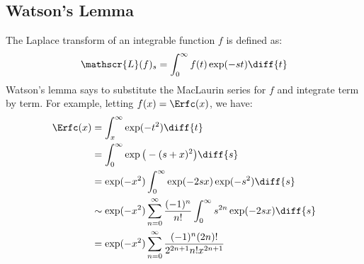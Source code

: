 \documentclass[crop=false,class=book,oneside]{standalone}
\begin{document}
        \subsection{Watson's Lemma}
            The Laplace transform of an integrable function $f$
            is defined as:
            \begin{equation}
                \mathscr{L}(f)_{s}=\int_{0}^{\infty}
                    f(t)\exp(-st)\diff{t}
            \end{equation}
            Watson's lemma says to substitute the MacLaurin
            series for $f$ and integrate term by term. For example,
            letting $f(x)=\Erfc(x)$, we have:
            \begin{align}
                \Erfc(x)&=\int_{x}^{\infty}\exp(-t^{2})\diff{t}\\
                &=\int_{0}^{\infty}\exp\big(-(s+x)^{2}\big)\diff{s}\\
                &=\exp(-x^{2})\int_{0}^{\infty}
                    \exp(-2sx)\exp(-s^{2})\diff{s}\\
                &\sim
                \exp(-x^{2})\sum_{n=0}^{\infty}\frac{(-1)^{n}}{n!}
                    \int_{0}^{\infty}s^{2n}\exp(-2sx)\diff{s}\\
                &=\exp(-x^{2})\sum_{n=0}^{\infty}
                    \frac{(-1)^{n}(2n)!}{2^{2n+1}n!x^{2n+1}}
            \end{align}
\end{document}
